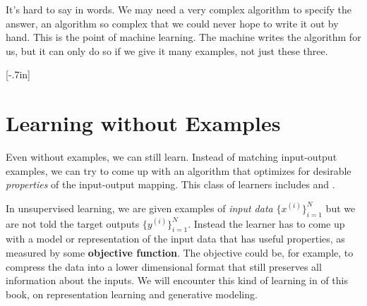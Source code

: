 It's hard to say in words. We may need a very complex algorithm to specify the answer, an algorithm so complex that we could never hope to write it out by hand. This is the point of machine learning. The machine writes the algorithm for us, but it can only do so if we give it many examples, not just these three.

[-.7in] 

\section{Learning without Examples}

Even without examples, we can still learn. Instead of matching input-output examples, we can try to come up with an algorithm that optimizes for desirable \emph{properties} of the input-output mapping. This class of learners includes  and . 


In unsupervised learning, we are given examples of \textit{input data} $\{x^{(i)}\}^N_{i=1}$ but we are not told the target outputs $\{y^{(i)}\}^N_{i=1}$. Instead the learner has to come up with a model or representation of the input data that has useful properties, as measured by some \textbf{objective function}. The objective could be, for example, to compress the data into a lower dimensional format that still preserves all information about the inputs. We will encounter this kind of learning in \partref{\ref{part:generative_models_and_representation_learning}} of this book, on representation learning and generative modeling.

